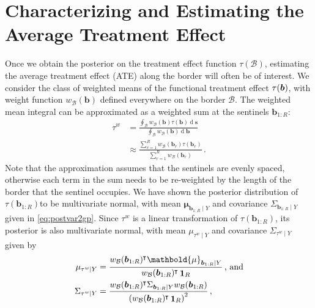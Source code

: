 \documentclass[letter]{article}
\let\originalleft\left
\let\originalright\right
\def\left#1{\mathopen{}\originalleft#1}
\def\right#1{\originalright#1\mathclose{}}
\DeclarePairedDelimiter{\parenthesis}{\lparen}{\rparen}
\newcommand{\del}[1]{\parenthesis*{#1}}
\DeclareMathOperator{\dif}{d}
\DeclareMathOperator{\ones}{\mathbf{1}}
\newcommand*{\trans}{^{\mkern-1.5mu\intercal}}
\newcommand{\svec}{\mathbold{s}}
\newcommand{\muvec}{\mathbold{\mu}}
\newcommand{\border}{\mathcal{B}}
\newcommand{\sentinel}{\bm{b}}
\newcommand{\numsent}{R}
\newcommand{\sentinels}{\sentinel_{1:\numsent}}
\newcommand{\isent}{r}
\newcommand{\tauw}{\tau^{w}}
\newcommand{\eqlabel}[1]{\label{#1}}
\newcommand{\weightb}{w_{\border}}
\begin{document}
    	\hypertarget{characterizing-and-estimating-the-average-treatment-effect}{%
\section{Characterizing and Estimating the Average Treatment Effect}\label{characterizing-and-estimating-the-average-treatment-effect}}
    


    	\label{sec:ate}
    


    	Once we obtain the posterior on the treatment effect function \(\tau(\border)\), estimating the average treatment effect (ATE) along the border will often be of interest.
We consider the class of weighted means of the functional treatment effect \(\tau\del{\sentinel}\),
with weight function \(\weightb(\sentinel)\) defined everywhere on the border \(\border\).
The weighted mean integral can be approximated as a weighted sum at the sentinels \(\sentinels\):
\begin{equation}\begin{split}
    \tauw &= \frac{\oint_\border \left. \weightb(\sentinel) \tau(\sentinel) \dif \svec \right.}
                  {\oint_\border \left. \weightb(\sentinel) \dif \sentinel \right.}\\
          &\approx \frac{\sum_{\isent=1}^\numsent \weightb(\sentinel_\isent) \tau(\sentinel_\isent)}
                       {\sum_{\isent=1}^\numsent \weightb(\sentinel_\isent) } \,.
\end{split}
\eqlabel{eq:weighted_estimand}
\end{equation}
Note that the approximation assumes that the sentinels are evenly spaced, otherwise each term in the sum needs to be re-weighted by the length of the border that the sentinel occupies.
We have shown the posterior distribution of \(\tau(\sentinels)\)to be multivariate normal, with mean \(\muvec_{\sentinels \mid Y}\) and covariance \(\Sigma_{\sentinels \mid Y}\) given in \eqref{eq:postvar2gp}.
Since \(\tauw\) is a linear transformation of \(\tau(\sentinels)\), its posterior is also multivariate normal, with mean \(\mu_{\tauw \mid Y}\) and covariance \(\Sigma_{\tauw \mid Y}\) given by
\begin{equation}\begin{split}
    \mu_{\tauw \mid Y} &= \frac{\weightb(\sentinels)\trans \muvec_{\sentinels \mid Y}}
    {\weightb(\sentinels)\trans  \ones_\numsent}\,\text{, and} \\
    \Sigma_{\tauw \mid Y} &= \frac{\weightb(\sentinels)\trans \Sigma_{\sentinels \mid Y} \weightb(\sentinels)}
                                  { \del{\weightb(\sentinels)\trans  \ones_\numsent }^2 } \,, \\
\end{split}
\eqlabel{eq:weighted_estimator}
\end{equation}
\end{document}
